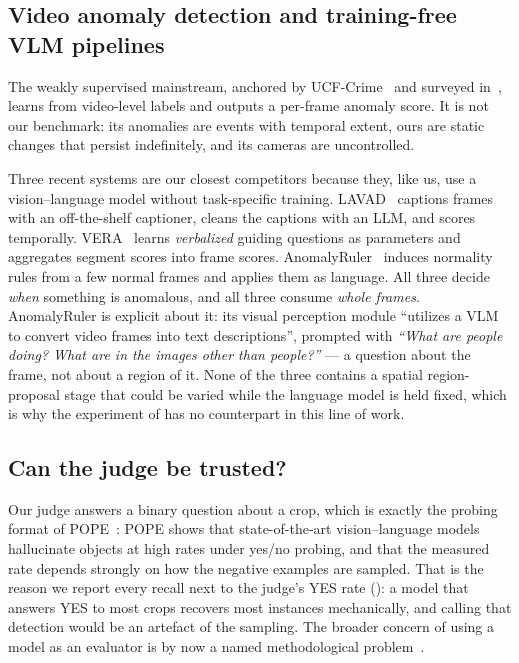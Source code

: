\subsection{Video anomaly detection and training-free VLM pipelines}
\label{sec:related:vad}

The weakly supervised mainstream, anchored by UCF-Crime~\cite{Sultani_2018} and
surveyed in~\cite{Duong_2023,Li_2025}, learns from video-level labels and
outputs a per-frame anomaly score. It is not our benchmark: its anomalies are
events with temporal extent, ours are static changes that persist
indefinitely, and its cameras are uncontrolled.

Three recent systems are our closest competitors because they, like us, use a
vision--language model without task-specific training.
LAVAD~\cite{Zanella_2024} captions frames with an off-the-shelf captioner,
cleans the captions with an LLM, and scores temporally.
VERA~\cite{Ye_2025} learns \emph{verbalized} guiding questions as parameters
and aggregates segment scores into frame scores.
AnomalyRuler~\cite{Yang_2024} induces normality rules from a few normal frames
and applies them as language. All three decide \emph{when} something is
anomalous, and all three consume \emph{whole frames}. AnomalyRuler is explicit
about it: its visual perception module ``utilizes a VLM to convert video frames
into text descriptions'', prompted with \emph{``What are people doing? What are
in the images other than people?''} --- a question about the frame, not about a
region of it. None of the three contains a spatial region-proposal stage that
could be varied while the language model is held fixed, which is why the
experiment of  has no counterpart in this line of
work.

\subsection{Can the judge be trusted?}
\label{sec:related:judge}

Our judge answers a binary question about a crop, which is exactly the probing
format of POPE~\cite{Li_2023}: POPE shows that state-of-the-art vision--language
models hallucinate objects at high rates under yes/no probing, and that the
measured rate depends strongly on how the negative examples are sampled. That
is the reason we report every recall next to the judge's YES rate
(): a model that answers YES to most crops recovers
most instances mechanically, and calling that detection would be an artefact of
the sampling. The broader concern of using a model as an evaluator is by now a
named methodological problem~\cite{Gu_2026}.

